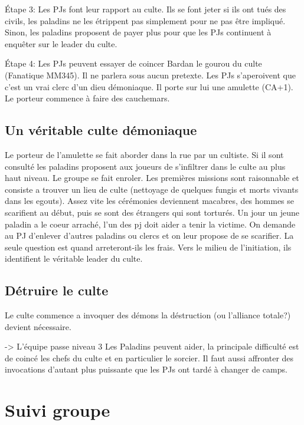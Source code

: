Étape 3: Les PJs font leur rapport au culte. Ils se font jeter si ils ont tués des civils, les paladins ne 
les étrippent pas simplement pour ne pas être impliqué. Sinon, les paladins proposent de payer plus pour 
que les PJs continuent à enquêter sur le leader du culte.

Étape 4: Les PJs peuvent essayer de coincer Bardan le gourou du culte (Fanatique MM345). Il ne parlera
sous aucun pretexte. Les PJs s'aperoivent que c'est un vrai clerc d'un dieu démoniaque. Il porte sur lui 
une amulette (CA+1). Le porteur commence à faire des cauchemars.

\subsection{Un véritable culte démoniaque}

Le porteur de l'amulette se fait aborder dans la rue par un cultiste. Si il sont consulté les paladins
proposent aux joueurs de s'infiltrer dans le culte au plus haut niveau. Le groupe se fait enroler. 
Les premières missions sont raisonnable et consiste a trouver un lieu de culte (nettoyage de quelques
fungis et morts vivants dans les egouts). Assez vite les cérémonies deviennent macabres, des hommes se 
scarifient au début, puis se sont des étrangers qui sont torturés. Un jour un jeune paladin a le coeur 
arraché, l'un des pj doit aider a tenir la victime. On demande au PJ d'enlever d'autres paladins ou
clercs et on leur propose de se scarifier. La seule question est quand arreteront-ils les frais. Vers le 
milieu de l'initiation, ils identifient le véritable leader du culte.

\subsection{Détruire le culte}

Le culte commence a invoquer des démons la déstruction (ou l'alliance totale?) devient nécessaire.

 -> L'équipe passe niveau 3
Les Paladins peuvent aider, la principale difficulté est de coincé les chefs du culte et en particulier
le sorcier. Il faut aussi affronter des invocations d'autant plus puissante que les PJs ont tardé à changer
de camps. 



\section{Suivi groupe}

